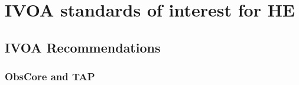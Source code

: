 \documentclass[11pt,a4paper]{ivoa}
\begin{document}

%
%
%
%
%


\section{IVOA standards of interest for HE}

\subsection{IVOA Recommendations}

\subsubsection{ObsCore and TAP}
\end{document}
